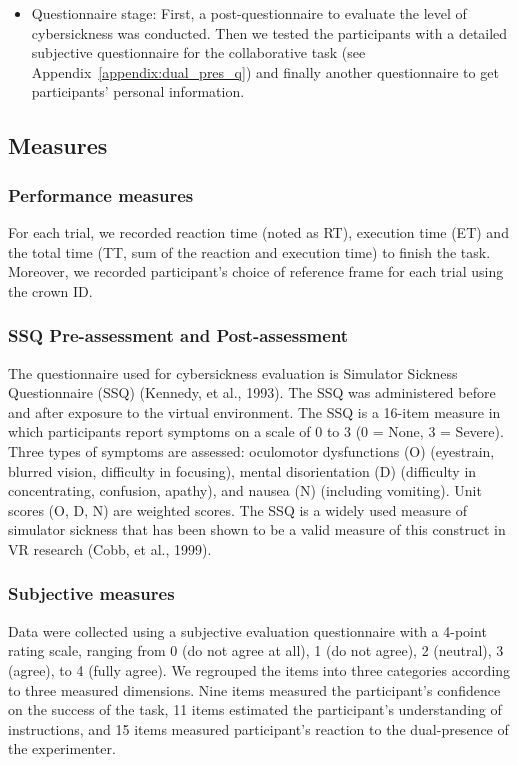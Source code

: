 \begin{itemize}
\item Questionnaire stage: First, a post-questionnaire to evaluate the level of cybersickness was conducted. Then we tested the participants with a detailed subjective questionnaire for the collaborative task (see Appendix~\ref{appendix:dual_pres_q}) and finally another questionnaire to get participants' personal information.
\end{itemize}


\subsection{Measures}
\subsubsection{Performance measures}
For each trial, we recorded reaction time (noted as RT), execution time (ET) and the total time (TT, sum of the reaction and execution time) to finish the task. Moreover, we recorded participant's choice of reference frame for each trial using the crown ID.

\subsubsection{SSQ Pre-assessment and Post-assessment}
The questionnaire used for cybersickness evaluation is Simulator Sickness Questionnaire (SSQ) (Kennedy, et al., 1993). The SSQ was administered before and after exposure to the virtual environment. The SSQ is a 16-item measure in which participants report symptoms on a scale of 0 to 3 (0 = None, 3 = Severe). Three types of symptoms are assessed: oculomotor dysfunctions (O) (eyestrain, blurred vision, difficulty in focusing), mental disorientation (D) (difficulty in concentrating, confusion, apathy), and nausea (N) (including vomiting). Unit scores (O, D, N) are weighted scores. The SSQ is a widely used measure of simulator sickness that has been shown to be a valid measure of this construct in VR research (Cobb, et al., 1999).

\subsubsection{Subjective measures}
Data were collected using a subjective evaluation questionnaire with a 4-point rating scale, ranging from 0 (do not agree at all), 1 (do not agree), 2 (neutral), 3 (agree), to 4 (fully agree). We regrouped the items into three categories according to three measured dimensions. Nine items measured the participant's confidence on the success of the task, 11 items estimated the participant's understanding of instructions, and 15 items measured participant's reaction to the dual-presence of the experimenter.


